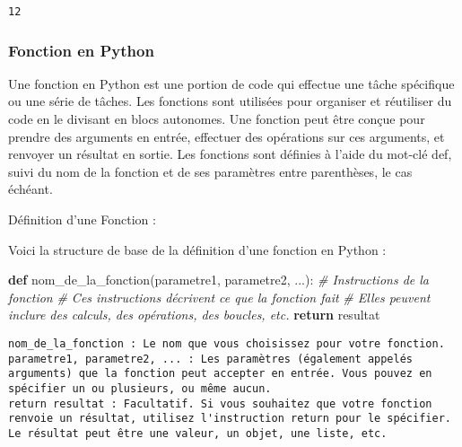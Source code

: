 \documentclass[11pt]{article}
\newenvironment{Shaded}{}{}
\newcommand{\KeywordTok}[1]{\textcolor[rgb]{0.00,0.44,0.13}{\textbf{{#1}}}}
\newcommand{\CommentTok}[1]{\textcolor[rgb]{0.38,0.63,0.69}{\textit{{#1}}}}
\newcommand{\NormalTok}[1]{{#1}}
\newcommand{\ControlFlowTok}[1]{\textcolor[rgb]{0.00,0.44,0.13}{\textbf{{#1}}}}
\begin{document}
    \begin{Verbatim}[commandchars=\\\{\}]
12
    \end{Verbatim}

    \hypertarget{fonction-en-python}{%
\subsubsection{Fonction en Python}\label{fonction-en-python}}

Une fonction en Python est une portion de code qui effectue une tâche
spécifique ou une série de tâches. Les fonctions sont utilisées pour
organiser et réutiliser du code en le divisant en blocs autonomes. Une
fonction peut être conçue pour prendre des arguments en entrée,
effectuer des opérations sur ces arguments, et renvoyer un résultat en
sortie. Les fonctions sont définies à l'aide du mot-clé def, suivi du
nom de la fonction et de ses paramètres entre parenthèses, le cas
échéant.

Définition d'une Fonction :

Voici la structure de base de la définition d'une fonction en Python :

\begin{Shaded}
\begin{Highlighting}[]

\KeywordTok{def}\NormalTok{ nom\_de\_la\_fonction(parametre1, parametre2, ...):}
    \CommentTok{\# Instructions de la fonction}
    \CommentTok{\# Ces instructions décrivent ce que la fonction fait}
    \CommentTok{\# Elles peuvent inclure des calculs, des opérations, des boucles, etc.}
    \ControlFlowTok{return}\NormalTok{ resultat}
\end{Highlighting}
\end{Shaded}

\begin{verbatim}
nom_de_la_fonction : Le nom que vous choisissez pour votre fonction.
parametre1, parametre2, ... : Les paramètres (également appelés arguments) que la fonction peut accepter en entrée. Vous pouvez en spécifier un ou plusieurs, ou même aucun.
return resultat : Facultatif. Si vous souhaitez que votre fonction renvoie un résultat, utilisez l'instruction return pour le spécifier. Le résultat peut être une valeur, un objet, une liste, etc.
\end{verbatim}
\end{document}
